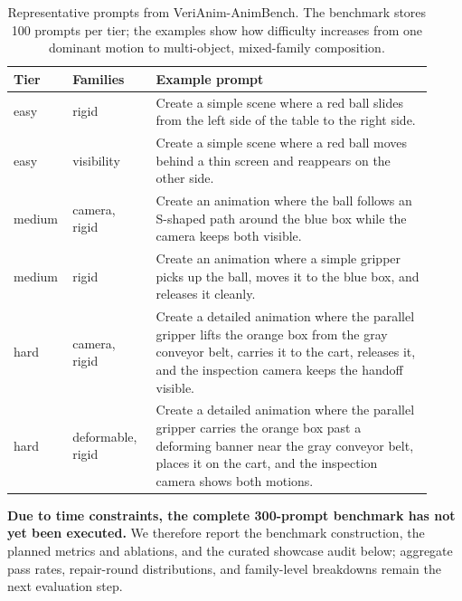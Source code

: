 \documentclass{article}
\begin{document}
\begin{table}[t]
\centering
\small
\setlength{\tabcolsep}{2.5pt}
\caption{Representative prompts from VeriAnim-AnimBench. The benchmark stores 100 prompts per tier; the examples show how difficulty increases from one dominant motion to multi-object, mixed-family composition.}
\label{tab:animbench-prompts}
\begin{tabular}{p{0.10\linewidth}p{0.19\linewidth}p{0.63\linewidth}}
\toprule
Tier & Families & Example prompt \\
\midrule
easy & rigid & Create a simple scene where a red ball slides from the left side of the table to the right side. \\
easy & visibility & Create a simple scene where a red ball moves behind a thin screen and reappears on the other side. \\
medium & camera, rigid & Create an animation where the ball follows an S-shaped path around the blue box while the camera keeps both visible. \\
medium & rigid & Create an animation where a simple gripper picks up the ball, moves it to the blue box, and releases it cleanly. \\
hard & camera, rigid & Create a detailed animation where the parallel gripper lifts the orange box from the gray conveyor belt, carries it to the cart, releases it, and the inspection camera keeps the handoff visible. \\
hard & deformable, rigid & Create a detailed animation where the parallel gripper carries the orange box past a deforming banner near the gray conveyor belt, places it on the cart, and the inspection camera shows both motions. \\
\bottomrule
\end{tabular}
\end{table}

\textbf{Due to time constraints, the complete 300-prompt benchmark has not yet been executed.} We therefore report the benchmark construction, the planned metrics and ablations, and the curated showcase audit below; aggregate pass rates, repair-round distributions, and family-level breakdowns remain the next evaluation step.
\end{document}
